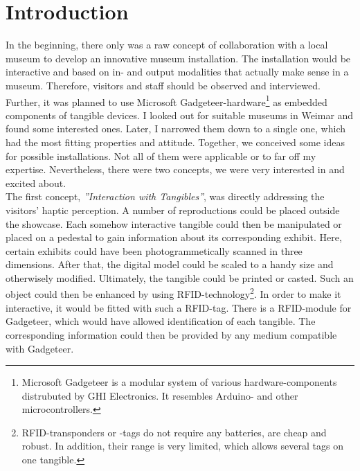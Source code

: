 \chapter{Introduction}
\label{introduction}

In the beginning, there only was a raw concept of collaboration with a local museum to develop an innovative museum installation. The installation would be interactive and based on in- and output modalities that actually make sense in a museum. Therefore, visitors and staff should be observed and interviewed. Further, it was planned to use Microsoft Gadgeteer-hardware\footnote{Microsoft Gadgeteer is a modular system of various hardware-components distrubuted by GHI Electronics. It resembles Arduino- and other microcontrollers.} as embedded components of tangible devices.
I looked out for suitable museums in Weimar and found some interested ones. Later, I narrowed them down to a single one, which had the most fitting properties and attitude. Together, we conceived some ideas for possible installations. Not all of them were applicable or to far off my expertise. Nevertheless, there were two concepts, we were very interested in and excited about.
\\
The first concept, \textit{''Interaction with Tangibles''}, was directly addressing the visitors' haptic perception. A number of reproductions could be placed outside the showcase. Each somehow interactive tangible could then be manipulated or placed on a pedestal to gain information about its corresponding exhibit. Here, certain exhibits could have been photogrammetically scanned in three dimensions. After that, the digital model could be scaled to a handy size and otherwisely modified. Ultimately, the tangible could be printed or casted. Such an object could then be enhanced by using \ac{RFID}-technology\footnote{RFID-transponders or -tags do not require any batteries, are cheap and robust. In addition, their range is very limited, which allows several tags on one tangible.}. In order to make it interactive, it would be fitted with such a \ac{RFID}-tag. There is a \ac{RFID}-module for Gadgeteer, which would have allowed identification of each tangible. The corresponding information could then be provided by any medium compatible with Gadgeteer.
